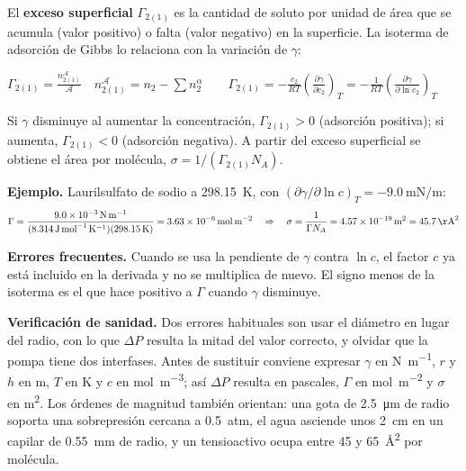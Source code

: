 \documentclass[10pt,letterpaper]{article}
\begin{document}
\vspace{6pt}
El \textbf{exceso superficial} $\Gamma_{2(1)}$ es la cantidad de soluto por unidad de área que se acumula (valor positivo) o falta (valor negativo) en la superficie. La isoterma de adsorción de Gibbs lo relaciona con la variación de $\gamma$:
\begin{clave}
$\displaystyle \Gamma_{2(1)}=\frac{n^{\mathcal{A}}_{2(1)}}{\mathcal{A}}\quad n^{\mathcal{A}}_{2(1)}=n_2-\sum n_2^{\alpha}\qquad
\Gamma_{2(1)}=-\frac{c_2}{RT}\left(\frac{\partial\gamma}{\partial c_2}\right)_T=-\frac{1}{RT}\left(\frac{\partial\gamma}{\partial\ln c_2}\right)_T$
\end{clave}
Si $\gamma$ disminuye al aumentar la concentración, $\Gamma_{2(1)}>0$ (adsorción positiva); si aumenta, $\Gamma_{2(1)}<0$ (adsorción negativa). A partir del exceso superficial se obtiene el área por molécula, $\sigma=1/(\Gamma_{2(1)}N_A)$.

\begin{apoyo}\small\textbf{Ejemplo.} Laurilsulfato de sodio a \SI{298,15}{\kelvin}, con $(\partial\gamma/\partial\ln c)_T=\SI{-9,0}{\milli\newton\per\meter}$:
\[\Gamma=\frac{\SI{9,0e-3}{\newton\per\meter}}{(\SI{8,314}{\joule\per\mole\per\kelvin})(\SI{298,15}{\kelvin})}=\SI{3,63e-6}{\mole\per\meter\squared}\quad\Rightarrow\quad\sigma=\frac{1}{\Gamma N_A}=\SI{4,57e-19}{\meter\squared}=\SI{45,7}{\AA\squared}\]
\end{apoyo}
\begin{alerta}\small\textbf{Errores frecuentes.} Cuando se usa la pendiente de $\gamma$ contra $\ln c$, el factor $c$ ya está incluido en la derivada y no se multiplica de nuevo. El signo menos de la isoterma es el que hace positivo a $\Gamma$ cuando $\gamma$ disminuye.\end{alerta}

\begin{nota}\small\textbf{Verificación de sanidad.} Dos errores habituales son usar el diámetro en lugar del radio, con lo que $\Delta P$ resulta la mitad del valor correcto, y olvidar que la pompa tiene dos interfases. Antes de sustituir conviene expresar $\gamma$ en \si{\newton\per\meter}, $r$ y $h$ en \si{\meter}, $T$ en \si{\kelvin} y $c$ en \si{\mole\per\meter\cubed}; así $\Delta P$ resulta en pascales, $\Gamma$ en \si{\mole\per\meter\squared} y $\sigma$ en \si{\meter\squared}. Los órdenes de magnitud también orientan: una gota de \SI{2,5}{\micro\meter} de radio soporta una sobrepresión cercana a \SI{0,5}{atm}, el agua asciende unos \SI{2}{\centi\meter} en un capilar de \SI{0,55}{\milli\meter} de radio, y un tensioactivo ocupa entre 45 y \SI{65}{\AA\squared} por molécula.\end{nota}
\end{document}
